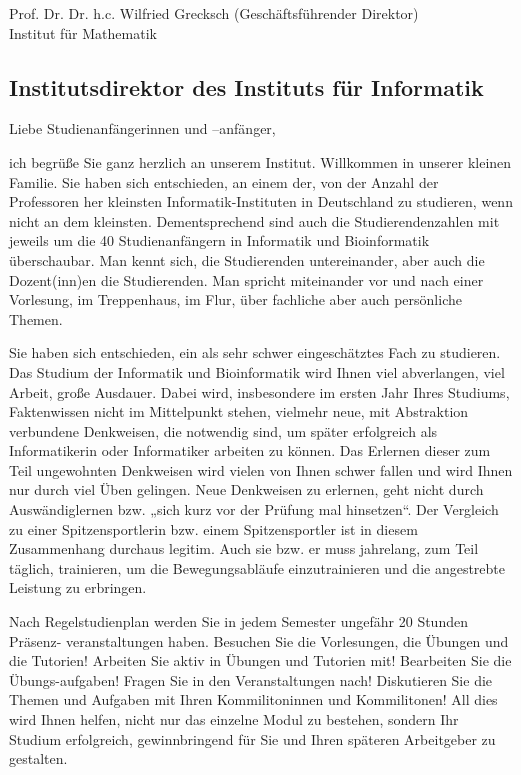 Prof. Dr. Dr. h.c. Wilfried Grecksch (Geschäftsführender Direktor)\\
Institut für Mathematik
    

\subsection{Institutsdirektor des Instituts für Informatik}

Liebe Studienanfängerinnen und –anfänger,

ich begrüße Sie ganz herzlich an unserem Institut. Willkommen in unserer kleinen Familie. Sie haben sich entschieden, an einem der, von der Anzahl der Professoren her  kleinsten Informatik-Instituten in Deutschland zu studieren, wenn nicht an dem kleinsten. Dementsprechend sind auch die Studierendenzahlen mit jeweils um die 40 Studienanfängern in Informatik und Bioinformatik überschaubar. Man kennt sich, die Studierenden untereinander, aber auch die Dozent(inn)en die Studierenden. Man spricht miteinander vor und nach einer Vorlesung, im Treppenhaus, im Flur, über fachliche aber auch persönliche Themen.
 
Sie haben sich entschieden, ein als sehr schwer eingeschätztes Fach zu studieren. 
Das Studium der Informatik und Bioinformatik wird Ihnen viel abverlangen, viel Arbeit, große Ausdauer.
Dabei wird, insbesondere im ersten Jahr Ihres Studiums, Faktenwissen nicht im Mittelpunkt stehen, vielmehr neue, mit Abstraktion verbundene Denkweisen, die notwendig sind, um später erfolgreich als Informatikerin oder Informatiker arbeiten zu können.
Das Erlernen dieser zum Teil ungewohnten Denkweisen wird vielen von Ihnen schwer fallen und wird Ihnen nur durch viel Üben gelingen.
Neue Denkweisen zu erlernen, geht nicht durch Auswändiglernen bzw. „sich kurz vor der Prüfung mal hinsetzen“.
Der Vergleich zu einer Spitzensportlerin bzw. einem Spitzensportler ist in diesem Zusammenhang durchaus legitim.
Auch sie bzw. er muss jahrelang, zum Teil täglich, trainieren, um die Bewegungsabläufe einzutrainieren und die angestrebte Leistung zu erbringen.

Nach Regelstudienplan werden Sie in jedem Semester ungefähr 20 Stunden Präsenz- veranstaltungen haben. Besuchen Sie die Vorlesungen, die Übungen und die Tutorien! Arbeiten Sie aktiv in Übungen und Tutorien mit! Bearbeiten Sie die Übungs-aufgaben! Fragen Sie in den Veranstaltungen nach! Diskutieren Sie die Themen und Aufgaben mit Ihren Kommilitoninnen und Kommilitonen! All dies wird Ihnen helfen, nicht nur das einzelne Modul zu bestehen, sondern Ihr Studium erfolgreich, gewinnbringend für Sie und Ihren späteren Arbeitgeber zu gestalten. 

